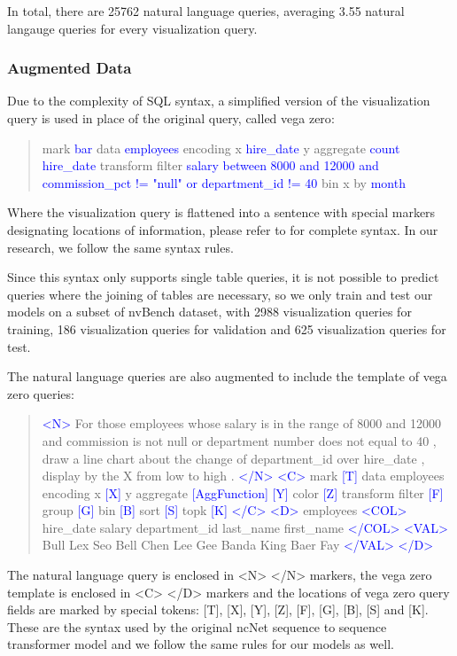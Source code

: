 \documentclass[
	a4paper, %
	10pt, %
	unnumberedsections, %
	twoside, %
]{t0003}
\newcommand{\blue}[1]{\textcolor{blue}{#1}}
\begin{document}
In total, there are 25762 natural language queries, averaging 3.55 natural langauge queries for every visualization query.

\subsubsection{Augmented Data}

Due to the complexity of SQL syntax, a simplified version of the visualization query is used in place of the original query, called vega zero\cite{Luo:2022qr}:

\begin{quote}
mark \blue{bar} data \blue{employees} encoding x \blue{hire\_date} y aggregate \blue{count hire\_date} transform filter \blue{salary between 8000 and 12000 and commission\_pct != "null" or department\_id != 40} bin x by \blue{month}	
\end{quote}

Where the visualization query is flattened into a sentence with special markers designating locations of information, please refer to \cite{Luo:2022qr} for complete syntax. In our research, we follow the same syntax rules.

Since this syntax only supports single table queries, it is not possible to predict queries where the joining of tables are necessary, so we only train and test our models on a subset of nvBench dataset, with 2988 visualization queries for training, 186 visualization queries for validation and 625 visualization queries for test.

The natural language queries are also augmented to include the template of vega zero queries:

\begin{quote}
\blue{<N>} For those employees whose salary is in the range of 8000 and 12000 and commission is not null or department number does not equal to 40 , draw a line chart about the change of department\_id over hire\_date , display by the X from low to high . \blue{</N>} \blue{<C>} mark \blue{[T]} data employees encoding x  \blue{[X]} y aggregate  \blue{[AggFunction] [Y]} color \blue{[Z]} transform filter \blue{[F]} group \blue{[G]} bin \blue{[B]} sort \blue{[S]} topk \blue{[K] </C> <D>} employees \blue{<COL>} hire\_date salary department\_id last\_name first\_name \blue{</COL> <VAL>} Bull Lex Seo Bell Chen Lee Gee Banda King Baer Fay \blue{</VAL> </D>}
\end{quote}

The natural language query is enclosed in <N> </N> markers, the vega zero template is enclosed in <C> </D> markers and the locations of vega zero query fields are marked by special tokens: [T], [X], [Y], [Z], [F], [G], [B], [S] and [K]. These are the syntax used by the original ncNet sequence to sequence transformer model and we follow the same rules for our models as well.
\end{document}
